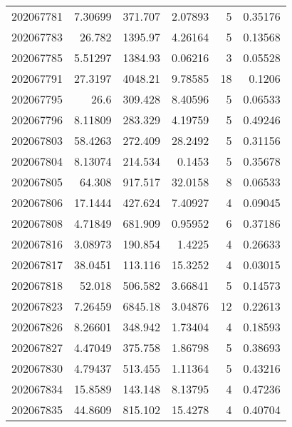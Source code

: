 \begin{tabular}{rrrrrr}
 202067781 &          7.30699 &      371.707  &            2.07893 &           5 & 0.35176 \\
 202067783 &         26.782   &     1395.97   &            4.26164 &           5 & 0.13568 \\
 202067785 &          5.51297 &     1384.93   &            0.06216 &           3 & 0.05528 \\
 202067791 &         27.3197  &     4048.21   &            9.78585 &          18 & 0.1206  \\
 202067795 &         26.6     &      309.428  &            8.40596 &           5 & 0.06533 \\
 202067796 &          8.11809 &      283.329  &            4.19759 &           5 & 0.49246 \\
 202067803 &         58.4263  &      272.409  &           28.2492  &           5 & 0.31156 \\
 202067804 &          8.13074 &      214.534  &            0.1453  &           5 & 0.35678 \\
 202067805 &         64.308   &      917.517  &           32.0158  &           8 & 0.06533 \\
 202067806 &         17.1444  &      427.624  &            7.40927 &           4 & 0.09045 \\
 202067808 &          4.71849 &      681.909  &            0.95952 &           6 & 0.37186 \\
 202067816 &          3.08973 &      190.854  &            1.4225  &           4 & 0.26633 \\
 202067817 &         38.0451  &      113.116  &           15.3252  &           4 & 0.03015 \\
 202067818 &         52.018   &      506.582  &            3.66841 &           5 & 0.14573 \\
 202067823 &          7.26459 &     6845.18   &            3.04876 &          12 & 0.22613 \\
 202067826 &          8.26601 &      348.942  &            1.73404 &           4 & 0.18593 \\
 202067827 &          4.47049 &      375.758  &            1.86798 &           5 & 0.38693 \\
 202067830 &          4.79437 &      513.455  &            1.11364 &           5 & 0.43216 \\
 202067834 &         15.8589  &      143.148  &            8.13795 &           4 & 0.47236 \\
 202067835 &         44.8609  &      815.102  &           15.4278  &           4 & 0.40704 \\

\end{tabular}
